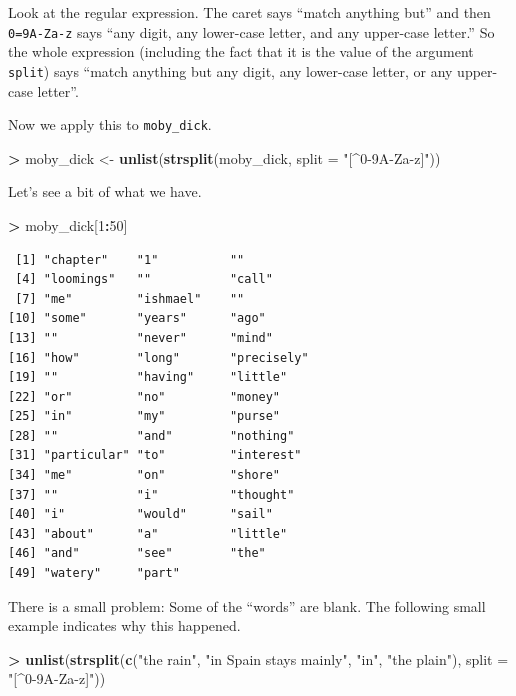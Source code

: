 \documentclass[
]{krantz}
\makeatletter
\newenvironment{Shaded}{\begin{snugshade}}{\end{snugshade}}
\newcommand{\DataTypeTok}[1]{\textcolor[rgb]{0.27,0.27,0.27}{#1}}
\newcommand{\DecValTok}[1]{\textcolor[rgb]{0.06,0.06,0.06}{#1}}
\newcommand{\KeywordTok}[1]{\textcolor[rgb]{0.27,0.27,0.27}{\textbf{#1}}}
\newcommand{\NormalTok}[1]{#1}
\newcommand{\OperatorTok}[1]{\textcolor[rgb]{0.43,0.43,0.43}{\textbf{#1}}}
\newcommand{\StringTok}[1]{\textcolor[rgb]{0.5,0.5,0.5}{#1}}
\newenvironment{kframe}{%
\medskip{}
\setlength{\fboxsep}{.8em}
 \def\at@end@of@kframe{}%
 \ifinner\ifhmode%
  \def\at@end@of@kframe{\end{minipage}}%
  \begin{minipage}{\columnwidth}%
 \fi\fi%
 \def\FrameCommand##1{\hskip\@totalleftmargin \hskip-\fboxsep
 \colorbox{shadecolor}{##1}\hskip-\fboxsep
     \hskip-\linewidth \hskip-\@totalleftmargin \hskip\columnwidth}%
 \MakeFramed {\advance\hsize-\width
   \@totalleftmargin\z@ \linewidth\hsize
   \@setminipage}}%
 {\par\unskip\endMakeFramed%
 \at@end@of@kframe}
\renewenvironment{Shaded}{\begin{kframe}}{\end{kframe}}
\makeatother
\begin{document}
Look at the regular expression. The caret says ``match anything but'' and then \texttt{0=9A-Za-z} says ``any digit, any lower-case letter, and any upper-case letter.'' So the whole expression (including the fact that it is the value of the argument \texttt{split}) says ``match anything but any digit, any lower-case letter, or any upper-case letter''.

Now we apply this to \texttt{moby\_dick}.

\begin{Shaded}
\begin{Highlighting}[]
\OperatorTok{\textgreater{}}\StringTok{ }\NormalTok{moby\_dick \textless{}{-}}\StringTok{ }\KeywordTok{unlist}\NormalTok{(}\KeywordTok{strsplit}\NormalTok{(moby\_dick, }\DataTypeTok{split =} \StringTok{"[\^{}0{-}9A{-}Za{-}z]"}\NormalTok{))}
\end{Highlighting}
\end{Shaded}

Let's see a bit of what we have.

\begin{Shaded}
\begin{Highlighting}[]
\OperatorTok{\textgreater{}}\StringTok{ }\NormalTok{moby\_dick[}\DecValTok{1}\OperatorTok{:}\DecValTok{50}\NormalTok{]}
\end{Highlighting}
\end{Shaded}

\begin{verbatim}
 [1] "chapter"    "1"          ""          
 [4] "loomings"   ""           "call"      
 [7] "me"         "ishmael"    ""          
[10] "some"       "years"      "ago"       
[13] ""           "never"      "mind"      
[16] "how"        "long"       "precisely" 
[19] ""           "having"     "little"    
[22] "or"         "no"         "money"     
[25] "in"         "my"         "purse"     
[28] ""           "and"        "nothing"   
[31] "particular" "to"         "interest"  
[34] "me"         "on"         "shore"     
[37] ""           "i"          "thought"   
[40] "i"          "would"      "sail"      
[43] "about"      "a"          "little"    
[46] "and"        "see"        "the"       
[49] "watery"     "part"      
\end{verbatim}

There is a small problem: Some of the ``words'' are blank. The following small example indicates why this happened.

\begin{Shaded}
\begin{Highlighting}[]
\OperatorTok{\textgreater{}}\StringTok{ }\KeywordTok{unlist}\NormalTok{(}\KeywordTok{strsplit}\NormalTok{(}\KeywordTok{c}\NormalTok{(}\StringTok{"the rain"}\NormalTok{, }\StringTok{"in Spain    stays mainly"}\NormalTok{, }\StringTok{"in"}\NormalTok{, }\StringTok{"the plain"}\NormalTok{), }\DataTypeTok{split =} \StringTok{"[\^{}0{-}9A{-}Za{-}z]"}\NormalTok{))}
\end{Highlighting}
\end{Shaded}
\end{document}
